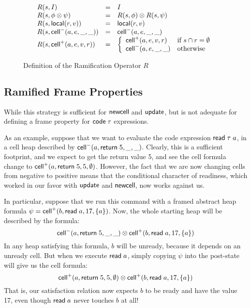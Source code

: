 \documentclass[preprint,natbib]{sigplanconf}
\begin{document}
\begin{figure}
{\small
  \begin{displaymath}
    \begin{array}{lcl}
      R(s, I)                 & = & I \\
      R(s, \phi \otimes \psi) & = & R(s, \phi) \otimes R(s, \psi) \\
      R(s, \mbox{\textsf{{local}}}({r}, {v}))   & = & \mbox{\textsf{{local}}}({r}, {v}) \\
      R(s, \mbox{\textsf{{cell}}}^{-}({a}, {e}, {\_}, {\_}))    & = & \mbox{\textsf{{cell}}}^{-}({a}, {e}, {\_}, {\_}) \\
      R(s, \mbox{\textsf{{cell}}}^{+}({a}, {e}, {v}, {r})) & = & \left\{\begin{array}{ll}
                                                \mbox{\textsf{{cell}}}^{+}({a}, {e}, {v}, {r}) 
                                              & \mbox{if } s \cap r = \emptyset \\
                                                \mbox{\textsf{{cell}}}^{-}({a}, {e}, {\_}, {\_})
                                              & \mbox{otherwise}
                                              \end{array}
                                       \right.
    \end{array}
  \end{displaymath}
}
\caption{Definition of the Ramification Operator $R$}
\label{ramify-def}
\end{figure}

\subsection{Ramified Frame Properties}

While this strategy is sufficient for $\mbox{\textsf{{newcell}}}\;$and
$\mbox{\textsf{{update}}}$, but is not adequate for defining a frame property
for $\mbox{\textsf{{code}}}\;{\tau}$ expressions. 

As an example, suppose that we want to evaluate the code expression $\mbox{\textsf{{read}}}\; \tau\;
a$, in a cell heap described by $\mbox{\textsf{{cell}}}^{-}({a}, {\mbox{\textsf{{return}}}\; 5}, {\_}, {\_})$.  Clearly,
this is a sufficient footprint, and we expect to get the return
value 5, and see the cell formula change to $\mbox{\textsf{{cell}}}^{+}({a}, {\mbox{\textsf{{return}}}\;
  5}, {5}, {\emptyset})$.  However, the fact that we are now changing cells
from negative to positive means that the conditional character of
readiness, which worked in our favor with $\mbox{\textsf{{update}}}$ and
$\mbox{\textsf{{newcell}}}\;\!\!$, now works against us.

In particular, suppose that we run this command with a framed abstract heap
formula $\psi = \mbox{\textsf{{cell}}}^{+}({b}, {\mbox{\textsf{{read}}}\; a}, {17}, {\{{a}\}})$. Now, the
whole starting heap will be described by the formula:
\begin{displaymath}
\mbox{\textsf{{cell}}}^{-}({a}, {\mbox{\textsf{{return}}}\; 5}, {\_}, {\_}) \otimes \mbox{\textsf{{cell}}}^{+}({b}, {\mbox{\textsf{{read}}}\; a}, {17}, {\{{a}\}})  
\end{displaymath}
In any heap satisfying this formula, $b$ will be unready, because it depends 
on an unready cell. But when we execute $\mbox{\textsf{{read}}}\; a$, simply copying $\psi$ 
into the post-state will give us the cell formula:
\begin{displaymath}
\mbox{\textsf{{cell}}}^{+}({a}, {\mbox{\textsf{{return}}}\; 5}, {5}, {\emptyset}) \otimes \mbox{\textsf{{cell}}}^{+}({b}, {\mbox{\textsf{{read}}}\; a}, {17}, {\{{a}\}})
\end{displaymath}
That is, our satisfaction relation now expects $b$ to be ready and have the 
value 17, even though $\mbox{\textsf{{read}}}\; a$ never touches $b$ at all!
\end{document}
